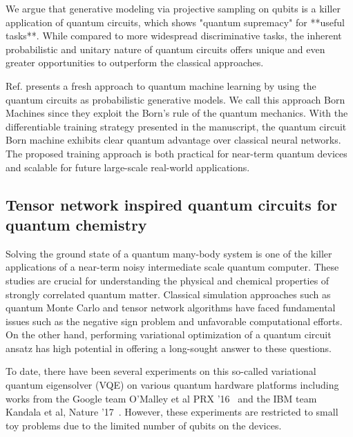 \documentclass[aps,longbibliography,english,superscriptaddress]{revtex4-1}
\begin{document}
We argue that generative modeling via projective sampling on qubits is a killer application of quantum circuits, which shows "quantum supremacy" for **useful tasks**. While compared to more widespread discriminative tasks, the inherent probabilistic and unitary nature of quantum circuits offers unique and even greater opportunities to outperform the classical approaches. 

Ref.\cite{Liu2018} presents a fresh approach to quantum machine learning by using the quantum circuits as probabilistic generative models. We call this approach Born Machines since they exploit the Born's rule of the quantum mechanics.
With the differentiable training strategy presented in the manuscript, the quantum circuit Born machine exhibits clear quantum advantage over classical neural networks. The proposed training approach is both practical for near-term quantum devices and scalable for future large-scale real-world applications.


\subsection{Tensor network inspired quantum circuits for quantum chemistry}
Solving the ground state of a quantum many-body system is one of the killer applications of a  near-term noisy intermediate scale quantum computer. These studies are crucial for understanding the physical and chemical properties of strongly correlated quantum matter. Classical simulation approaches such as quantum Monte Carlo and tensor network algorithms have faced fundamental issues such as the negative sign problem and unfavorable computational efforts. On the other hand, performing variational optimization of a quantum circuit ansatz has high potential in offering a long-sought answer to these questions.   

To date, there have been several experiments on this so-called variational quantum eigensolver (VQE) on various quantum hardware platforms including works from the Google team O'Malley et al PRX '16~\cite{OMalley2016}  and the IBM team Kandala  et al, Nature '17~\cite{Kandala2017}.  However, these experiments are restricted to small toy problems due to the limited number of qubits on the devices.  
\end{document}
